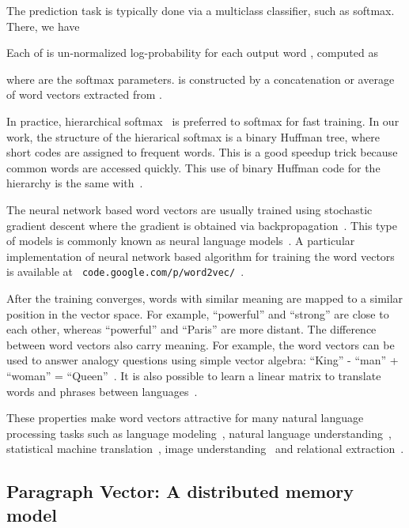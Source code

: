 \documentclass{article}
\begin{document}
The prediction task is typically done via a multiclass
classifier, such as softmax. There, we have

Each of  is un-normalized log-probability for each output word , computed as

where  are the softmax parameters.  is constructed by a
concatenation or average of word vectors extracted from .

In practice, hierarchical
softmax~\cite{hsoft_first,mnih2008scalable,phrases0} is preferred to
softmax for fast training. In our work, the structure of the
hierarical softmax is a binary Huffman tree, where short codes are
assigned to frequent words. This is a good speedup trick because
common words are accessed quickly. This use of binary Huffman code for
the hierarchy is the same with~\cite{phrases0}.


The neural network based word vectors are usually trained using
stochastic gradient descent where the gradient is obtained via
backpropagation~\cite{rumelhart1986learning}. This type of models is
commonly known as neural language models~\cite{bengio2006neural}.  A
particular implementation of neural network based algorithm for
training the word vectors is available at {\tt
  code.google.com/p/word2vec/}~\cite{mikolov}.



After the training converges, words with similar meaning are mapped to
a similar position in the vector space. For example, ``powerful'' and
``strong'' are close to each other, whereas ``powerful'' and ``Paris''
are more distant. The difference between word vectors also carry
meaning. For example, the word vectors can be used to answer analogy
questions using simple vector algebra: ``King'' - ``man'' + ``woman''
= ``Queen''~\cite{mikolov2013naacl}.  It is also possible to learn a
linear matrix to translate words and phrases between
languages~\cite{MikolovLS13}.

These properties make word vectors attractive for many natural
language processing tasks such as language
modeling~\cite{bengio2006neural,mikolov2012}, natural language
understanding~\cite{collobert2008unified,Zhila}, statistical machine
translation~\cite{MikolovLS13,zou13}, image
understanding~\cite{Frome13} and relational
extraction~\cite{Socher13b}.

\subsection{Paragraph Vector: A distributed memory model}
\end{document}
